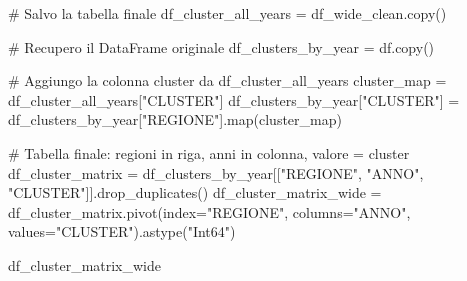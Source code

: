 \documentclass[
  letterpaper,
  DIV=11,
  numbers=noendperiod]{scrartcl}
\newenvironment{Shaded}{\begin{snugshade}}{\end{snugshade}}
\newcommand{\BuiltInTok}[1]{\textcolor[rgb]{0.00,0.23,0.31}{#1}}
\newcommand{\CommentTok}[1]{\textcolor[rgb]{0.37,0.37,0.37}{#1}}
\newcommand{\NormalTok}[1]{\textcolor[rgb]{0.00,0.23,0.31}{#1}}
\newcommand{\OperatorTok}[1]{\textcolor[rgb]{0.37,0.37,0.37}{#1}}
\newcommand{\StringTok}[1]{\textcolor[rgb]{0.13,0.47,0.30}{#1}}
\begin{document}
\begin{Shaded}
\begin{Highlighting}[]
\CommentTok{\# Salvo la tabella finale}
\NormalTok{df\_cluster\_all\_years }\OperatorTok{=}\NormalTok{ df\_wide\_clean.copy()}

\CommentTok{\# Recupero il DataFrame originale}
\NormalTok{df\_clusters\_by\_year }\OperatorTok{=}\NormalTok{ df.copy()}

\CommentTok{\# Aggiungo la colonna cluster da df\_cluster\_all\_years}
\NormalTok{cluster\_map }\OperatorTok{=}\NormalTok{ df\_cluster\_all\_years[}\StringTok{"CLUSTER"}\NormalTok{]}
\NormalTok{df\_clusters\_by\_year[}\StringTok{"CLUSTER"}\NormalTok{] }\OperatorTok{=}\NormalTok{ df\_clusters\_by\_year[}\StringTok{"REGIONE"}\NormalTok{].}\BuiltInTok{map}\NormalTok{(cluster\_map)}

\CommentTok{\# Tabella finale: regioni in riga, anni in colonna, valore = cluster}
\NormalTok{df\_cluster\_matrix }\OperatorTok{=}\NormalTok{ df\_clusters\_by\_year[[}\StringTok{"REGIONE"}\NormalTok{, }\StringTok{"ANNO"}\NormalTok{, }\StringTok{"CLUSTER"}\NormalTok{]].drop\_duplicates()}
\NormalTok{df\_cluster\_matrix\_wide }\OperatorTok{=}\NormalTok{ df\_cluster\_matrix.pivot(index}\OperatorTok{=}\StringTok{"REGIONE"}\NormalTok{, columns}\OperatorTok{=}\StringTok{"ANNO"}\NormalTok{, values}\OperatorTok{=}\StringTok{"CLUSTER"}\NormalTok{).astype(}\StringTok{"Int64"}\NormalTok{)}

\NormalTok{df\_cluster\_matrix\_wide}
\end{Highlighting}
\end{Shaded}
\end{document}

